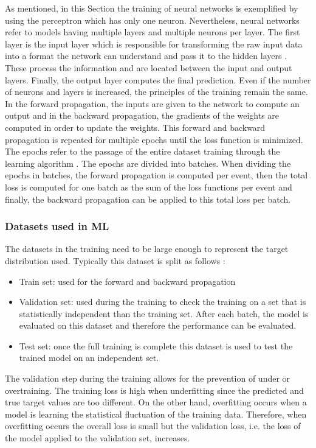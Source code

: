 As mentioned, in this Section the training of neural networks is exemplified by using the perceptron which has only one neuron. Nevertheless, neural networks refer to models having multiple layers and multiple neurons per layer.  The first layer is the input layer which is responsible for transforming the raw input data into a format the network can understand and pass it to the hidden layers \cite{layers}.  These process the information and are located between the input and output layers. Finally, the output layer computes the final prediction. Even if the number of neurons and layers is increased, the principles of the training remain the same. In the forward propagation, the inputs are given to the network to compute an output and in the backward propagation, the gradients of the weights are computed in order to update the weights. This forward and backward propagation is repeated for multiple epochs until the loss function is minimized. The epochs refer to the passage of the entire dataset training through the learning algorithm \cite{epoch_batch}. The epochs are divided into batches. When dividing the epochs in batches, the forward propagation is computed per event, then the total loss is computed for one batch as the sum of the loss functions per event and finally, the backward propagation can be applied to this total loss per batch.

\subsubsection{Datasets used in ML}

The datasets in the training need to be large enough to represent the target distribution used. Typically this dataset is split as follows \cite{neutrinoslides}:
\begin{itemize}
    \item Train set: used for the forward and backward propagation
    \item Validation set: used during the training to check the training on a set that is statistically independent than the training set. After each batch, the model is evaluated on this dataset and therefore the performance can be evaluated.
    \item Test set: once the full training is complete this dataset is used to test the trained model on an independent set.
\end{itemize}

The validation step during the training allows for the prevention of under or overtraining. The training loss is high when underfitting since the predicted and true target values are too different. On the other hand, overfitting occurs when a model is learning the statistical fluctuation of the training data. Therefore, when overfitting occurs the overall loss is small but the validation loss, i.e. the loss of the model applied to the validation set, increases. 

